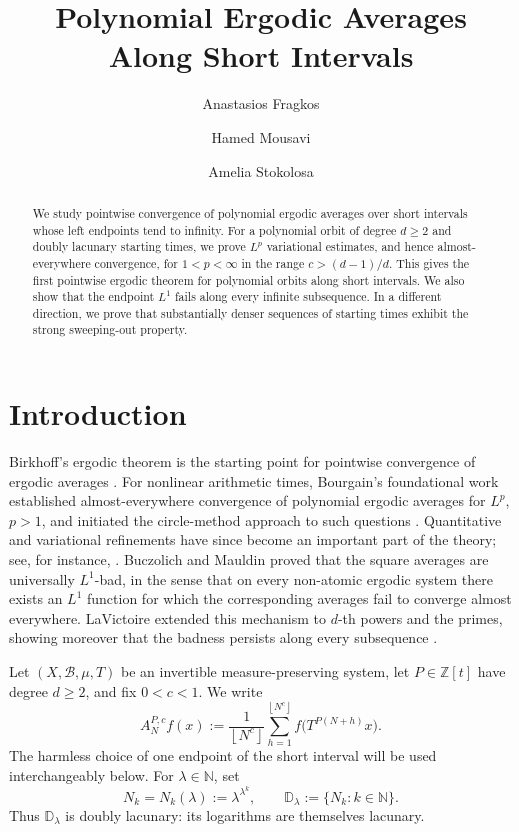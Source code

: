 \documentclass[12pt,leqno]{amsart}
\title{ Polynomial Ergodic Averages Along  Short Intervals 
}
\author[A. Fragkos]{Anastasios Fragkos}
\author[H. Mousavi]{Hamed Mousavi}
\author[A. Stokolosa]{Amelia Stokolosa}
\def\N {\mathbb{N}}
\newcounter{counter}
\newcounter{counter2}
\numberwithin{equation}{section}
\numberwithin{counter2}{section}
\newcounter{theorem}
\theoremstyle{definition}
\theoremstyle{plain}
\newcommand{\floor}[1]{\left\lfloor #1 \right\rfloor}
\begin{document}
    	\begin{abstract}
We study pointwise convergence of polynomial ergodic averages over short intervals whose left endpoints tend to infinity. For a polynomial orbit of degree $d\geq2$ and doubly lacunary starting times, we prove $L^p$ variational estimates, and hence almost-everywhere convergence, for $1<p<\infty$ in the range $c>(d-1)/d$. This gives the first pointwise ergodic theorem for polynomial orbits along short intervals. We also show that the endpoint $L^1$ fails along every infinite subsequence. In a different direction, we prove that substantially denser sequences of starting times exhibit the strong sweeping-out property.
	\end{abstract}
	\maketitle



    
	\section{Introduction}


Birkhoff's ergodic theorem is the starting point for pointwise convergence of ergodic averages \cite{Birkhoff1931}. For nonlinear arithmetic times, Bourgain's
foundational work established almost-everywhere convergence of polynomial
ergodic averages for $L^p$, $p>1$, and initiated the circle-method approach to
such questions \cite{Bourgain_88_Lp,Bourgain_88_max,Bourgain_89_arithmetic_sets}.
Quantitative and variational refinements have since become an important part of
the theory; see, for instance,
\cite{Krause2014,MirekSteinTrojan2017,MirekSteinZorinKranich2020}. Buczolich and Mauldin proved that the square
averages are universally $L^1$-bad, in the sense that on every non-atomic
ergodic system there exists an $L^1$ function for which the corresponding
averages fail to converge almost everywhere. LaVictoire extended this mechanism
to $d$-th powers and the primes, showing moreover that the badness persists
along every subsequence \cite{BM,L9}. 

Let $(X,\mathcal B,\mu,T)$ be an invertible measure-preserving system, let
$P\in\mathbb Z[t]$ have degree $d\geq2$, and fix $0<c<1$.  We write
\[A_N^{P,c}f(x):=\frac1{\floor{N^c}}\sum_{h=1}^{\floor{N^c}}
f\bigl(T^{P(N+h)}x\bigr).
\]
The harmless choice of one endpoint of the short interval will be used
interchangeably below.
For $\lambda \in \N $, set
\[
N_k=N_k(\lambda):=\lambda^{\lambda^k},
\qquad
\mathbb D_\lambda:=\{N_k:k\in\mathbb N\}.
\]
Thus $\mathbb D_\lambda$ is doubly lacunary: its logarithms are themselves
lacunary.  
\end{document}
